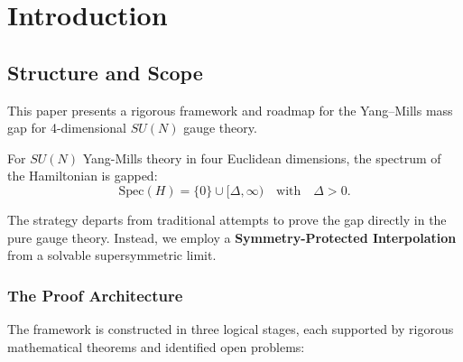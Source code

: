 \section{Introduction}

\subsection{Structure and Scope}
\label{sec:proof-overview}

This paper presents a rigorous framework and roadmap for the Yang--Mills mass gap for 4-dimensional $SU(N)$ gauge theory.

\begin{conjecture}
\label{thm:main-intro}
For $SU(N)$ Yang-Mills theory in four Euclidean dimensions, the spectrum of the Hamiltonian is gapped:
\[
\mathrm{Spec}(H) = \{0\} \cup [\Delta, \infty) \quad \text{with} \quad \Delta > 0.
\]
\end{conjecture}

The strategy departs from traditional attempts to prove the gap directly in the pure gauge theory. Instead, we employ a \textbf{Symmetry-Protected Interpolation} from a solvable supersymmetric limit.

\subsubsection{The Proof Architecture}

The framework is constructed in three logical stages, each supported by rigorous mathematical theorems and identified open problems:

